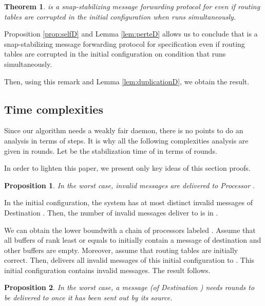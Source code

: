 \documentclass[11pt]{article}
\newtheorem{theorem}{Theorem}
\newtheorem{proposition}{Proposition}
\newenvironment{proof}{{\noindent\bf Proof. } }{{\hfill }}
\newenvironment{sketchproof}{{\noindent\bf Sketch of proof. } }{{\hfill }}
\begin{document}
\begin{theorem} \label{th:snapD}
\AD is a snap-stabilizing message forwarding protocol for  even if routing tables are corrupted in the initial configuration when  runs simultaneously.
\end{theorem}

\begin{proof}
Proposition \ref{prop:selfD} and Lemma \ref{lem:perteD} allows us to conclude that \AD is a snap-stabilizing message forwarding protocol for specification  even if routing tables are corrupted in the initial configuration on condition that  runs simultaneously.

Then, using this remark and Lemma \ref{lem:duplicationD}, we obtain the result.
\end{proof}

\subsection{Time complexities} \label{sub:analyseD}

Since our algorithm needs a weakly fair daemon, there is no points to do an analysis in terms of steps. It is why all the following complexities analysis are given in rounds. Let  be the stabilization time of  in terms of rounds.

In order to lighten this paper, we present only key ideas of this section proofs.

\begin{proposition} \label{prop:analysemesD}
In the worst case,  invalid messages are delivered to Processor .
\end{proposition}

\begin{sketchproof}
In the initial configuration, the system has at most  distinct invalid messages of Destination . Then, the number of invalid messages deliver to  is in . 

We can obtain the lower boundwith a chain of  processors labeled . Assume that all buffers of rank least or equals to  initially contain a message of destination  and other buffers are empty. Moreover, assume that routing tables are initially correct. Then, \AD delivers all invalid messages of this initial configuration to . This initial configuration contains  invalid messages. The result follows.
\end{sketchproof}

\begin{proposition} \label{prop:complexiteD}
In the worst case, a message  (of Destination ) needs  rounds to be delivered to  once it has been sent out by its source.
\end{proposition}
\end{document}
